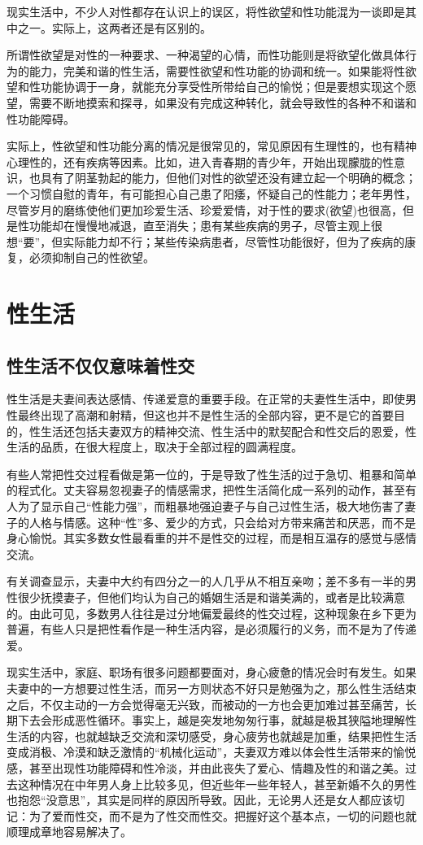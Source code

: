 \documentclass[12pt,UTF8]{ctexbook}
\begin{document}
现实生活中，不少人对性都存在认识上的误区，将性欲望和性功能混为一谈即是其中之一。实际上，这两者还是有区别的。

所谓性欲望是对性的一种要求、一种渴望的心情，而性功能则是将欲望化做具体行为的能力，完美和谐的性生活，需要性欲望和性功能的协调和统一。如果能将性欲望和性功能协调于一身，就能充分享受性所带给自己的愉悦；但是要想实现这个愿望，需要不断地摸索和探寻，如果没有完成这种转化，就会导致性的各种不和谐和性功能障碍。

实际上，性欲望和性功能分离的情况是很常见的，常见原因有生理性的，也有精神心理性的，还有疾病等因素。比如，进入青春期的青少年，开始出现朦胧的性意识，也具有了阴茎勃起的能力，但他们对性的欲望还没有建立起一个明确的概念；一个习惯自慰的青年，有可能担心自己患了阳痿，怀疑自己的性能力；老年男性，尽管岁月的磨练使他们更加珍爱生活、珍爱爱情，对于性的要求(欲望)也很高，但是性功能却在慢慢地减退，直至消失；患有某些疾病的男子，尽管主观上很想“要”，但实际能力却不行；某些传染病患者，尽管性功能很好，但为了疾病的康复，必须抑制自己的性欲望。

\part{性生活}

\chapter{性生活不仅仅意味着性交}

性生活是夫妻间表达感情、传递爱意的重要手段。在正常的夫妻性生活中，即使男性最终出现了高潮和射精，但这也并不是性生活的全部内容，更不是它的首要目的，性生活还包括夫妻双方的精神交流、性生活中的默契配合和性交后的恩爱，性生活的品质，在很大程度上，取决于全部过程的圆满程度。

有些人常把性交过程看做是第一位的，于是导致了性生活的过于急切、粗暴和简单的程式化。丈夫容易忽视妻子的情感需求，把性生活简化成一系列的动作，甚至有人为了显示自己“性能力强”，而粗暴地强迫妻子与自己过性生活，极大地伤害了妻子的人格与情感。这种“性”多、爱少的方式，只会给对方带来痛苦和厌恶，而不是身心愉悦。其实多数女性最看重的并不是性交的过程，而是相互温存的感觉与感情交流。

有关调查显示，夫妻中大约有四分之一的人几乎从不相互亲吻；差不多有一半的男性很少抚摸妻子，但他们均认为自己的婚姻生活是和谐美满的，或者是比较满意的。由此可见，多数男人往往是过分地偏爱最终的性交过程，这种现象在乡下更为普遍，有些人只是把性看作是一种生活内容，是必须履行的义务，而不是为了传递爱。

现实生活中，家庭、职场有很多问题都要面对，身心疲惫的情况会时有发生。如果夫妻中的一方想要过性生活，而另一方则状态不好只是勉强为之，那么性生活结束之后，不仅主动的一方会觉得毫无兴致，而被动的一方也会更加难过甚至痛苦，长期下去会形成恶性循环。事实上，越是突发地匆匆行事，就越是极其狭隘地理解性生活的内容，也就越缺乏交流和深切感受，身心疲劳也就越是加重，结果把性生活变成消极、冷漠和缺乏激情的“机械化运动”，夫妻双方难以体会性生活带来的愉悦感，甚至出现性功能障碍和性冷淡，并由此丧失了爱心、情趣及性的和谐之美。过去这种情况在中年男人身上比较多见，但近些年一些年轻人，甚至新婚不久的男性也抱怨“没意思”，其实是同样的原因所导致。因此，无论男人还是女人都应该切记：为了爱而性交，而不是为了性交而性交。把握好这个基本点，一切的问题也就顺理成章地容易解决了。
\end{document}
